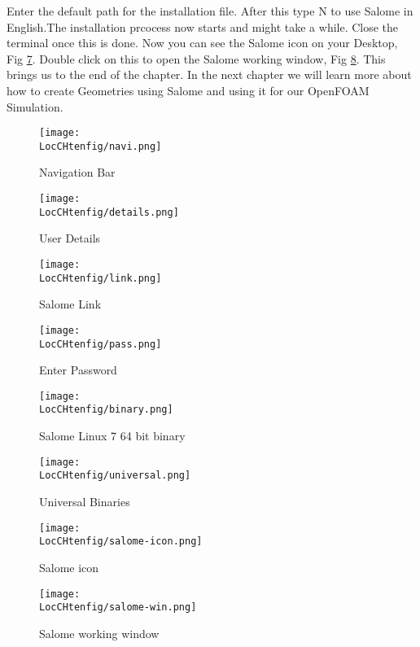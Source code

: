 \flushleft Enter the default path for the installation file. After this type N to use Salome in English.The installation prcocess now starts and might take a while. Close the terminal once this is done. Now you can see the Salome icon on your Desktop, Fig \ref{salome-icon}. Double click on this to open the Salome working window, Fig \ref{salome-win}. This brings us to the end of the chapter. In the next chapter we will learn more about how to create Geometries using Salome and using it for our OpenFOAM Simulation.



\begin{figure}[h]  
\centering
\texttt{[image: \\LocCHtenfig/navi.png]}
\caption{Navigation Bar}
\label{navi}
\end{figure}

\begin{figure}[h]  
\centering
\texttt{[image: \\LocCHtenfig/details.png]}
\caption{User Details}
\label{details}
\end{figure}

\begin{figure}[h]  
\centering
\texttt{[image: \\LocCHtenfig/link.png]}
\caption{Salome Link}
\label{link}
\end{figure}

\begin{figure}[h]  
\centering
\texttt{[image: \\LocCHtenfig/pass.png]}
\caption{Enter Password}
\label{pass}
\end{figure}

\begin{figure}[h]  
\centering
\texttt{[image: \\LocCHtenfig/binary.png]}
\caption{Salome Linux 7 64 bit binary}
\label{binary}
\end{figure}

\begin{figure}[h]  
\centering
\texttt{[image: \\LocCHtenfig/universal.png]}
\caption{Universal Binaries}
\label{univ}
\end{figure}

\begin{figure}[h]  
\centering
\texttt{[image: \\LocCHtenfig/salome-icon.png]}
\caption{Salome icon}
\label{salome-icon}
\end{figure}

\begin{figure}[h]  
\centering
\texttt{[image: \\LocCHtenfig/salome-win.png]}
\caption{Salome working window}
\label{salome-win}
\end{figure}
